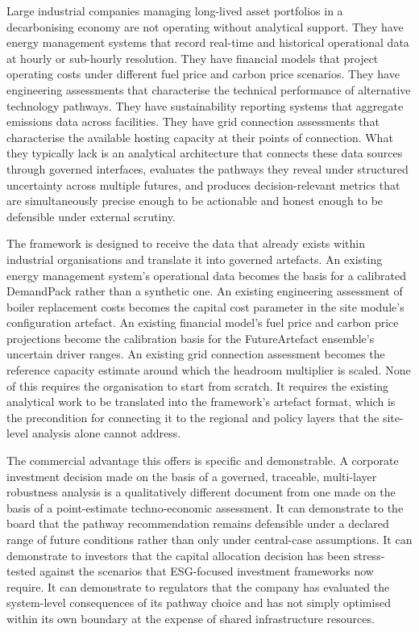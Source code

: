 \documentclass[
  11pt,
  a4paper,
  twoside,
  openright]{scrbook}
\begin{document}
Large industrial companies managing long-lived asset portfolios in a
decarbonising economy are not operating without analytical support. They
have energy management systems that record real-time and historical
operational data at hourly or sub-hourly resolution. They have financial
models that project operating costs under different fuel price and
carbon price scenarios. They have engineering assessments that
characterise the technical performance of alternative technology
pathways. They have sustainability reporting systems that aggregate
emissions data across facilities. They have grid connection assessments
that characterise the available hosting capacity at their points of
connection. What they typically lack is an analytical architecture that
connects these data sources through governed interfaces, evaluates the
pathways they reveal under structured uncertainty across multiple
futures, and produces decision-relevant metrics that are simultaneously
precise enough to be actionable and honest enough to be defensible under
external scrutiny.

The framework is designed to receive the data that already exists within
industrial organisations and translate it into governed artefacts. An
existing energy management system's operational data becomes the basis
for a calibrated DemandPack rather than a synthetic one. An existing
engineering assessment of boiler replacement costs becomes the capital
cost parameter in the site module's configuration artefact. An existing
financial model's fuel price and carbon price projections become the
calibration basis for the FutureArtefact ensemble's uncertain driver
ranges. An existing grid connection assessment becomes the reference
capacity estimate around which the headroom multiplier is scaled. None
of this requires the organisation to start from scratch. It requires the
existing analytical work to be translated into the framework's artefact
format, which is the precondition for connecting it to the regional and
policy layers that the site-level analysis alone cannot address.

The commercial advantage this offers is specific and demonstrable. A
corporate investment decision made on the basis of a governed,
traceable, multi-layer robustness analysis is a qualitatively different
document from one made on the basis of a point-estimate techno-economic
assessment. It can demonstrate to the board that the pathway
recommendation remains defensible under a declared range of future
conditions rather than only under central-case assumptions. It can
demonstrate to investors that the capital allocation decision has been
stress-tested against the scenarios that ESG-focused investment
frameworks now require. It can demonstrate to regulators that the
company has evaluated the system-level consequences of its pathway
choice and has not simply optimised within its own boundary at the
expense of shared infrastructure resources.
\end{document}
